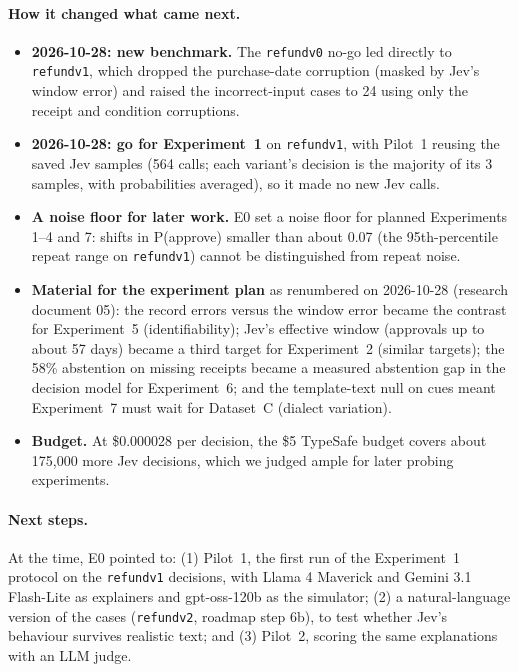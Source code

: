 \documentclass[11pt]{article}
\renewcommand{\_}{\origunderscore\allowbreak}
\begin{document}
\paragraph{How it changed what came next.}
\begin{itemize}[nosep]
  \item \textbf{2026-10-28: new benchmark.} The \texttt{refund\_v0} no-go led directly to \texttt{refund\_v1}, which dropped the purchase-date corruption (masked by Jev's window error) and raised the incorrect-input cases to 24 using only the receipt and condition corruptions.
  \item \textbf{2026-10-28: go for Experiment~1} on \texttt{refund\_v1}, with Pilot~1 reusing the saved Jev samples (564 calls; each variant's decision is the majority of its 3 samples, with probabilities averaged), so it made no new Jev calls.
  \item \textbf{A noise floor for later work.} E0 set a noise floor for planned Experiments 1--4 and 7: shifts in P(approve) smaller than about 0.07 (the 95th-percentile repeat range on \texttt{refund\_v1}) cannot be distinguished from repeat noise.
  \item \textbf{Material for the experiment plan} as renumbered on 2026-10-28 (research document 05): the record errors versus the window error became the contrast for Experiment~5 (identifiability); Jev's effective window (approvals up to about 57 days) became a third target for Experiment~2 (similar targets); the 58\% abstention on missing receipts became a measured abstention gap in the decision model for Experiment~6; and the template-text null on cues meant Experiment~7 must wait for Dataset~C (dialect variation).
  \item \textbf{Budget.} At \$0.000028 per decision, the \$5 TypeSafe budget covers about 175,000 more Jev decisions, which we judged ample for later probing experiments.
\end{itemize}

\paragraph{Next steps.}
At the time, E0 pointed to: (1) Pilot~1, the first run of the Experiment~1 protocol on the \texttt{refund\_v1} decisions, with Llama 4 Maverick and Gemini 3.1 Flash-Lite as explainers and gpt-oss-120b as the simulator; (2) a natural-language version of the cases (\texttt{refund\_v2}, roadmap step 6b), to test whether Jev's behaviour survives realistic text; and (3) Pilot~2, scoring the same explanations with an LLM judge.
\end{document}
